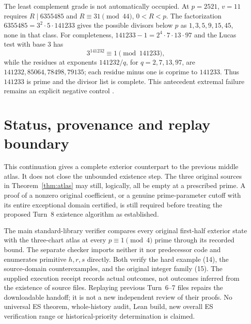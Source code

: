 The least complement grade is not automatically occupied. At $p=2521$, $v=11$
requires $R\mid6355485$ and $R\equiv31\pmod{44}$, $0<R<p$.
The factorization $6355485=3^2\cdot5\cdot141233$ gives the possible divisors
below $p$ as $1,3,5,9,15,45$, none in that class.  For completeness,
$141233-1=2^4\cdot7\cdot13\cdot97$ and the Lucas test with base $3$ has
\[
 3^{141232}\equiv1\pmod{141233},
\]
while the residues at exponents $141232/q$, for $q=2,7,13,97$, are
$141232,85064,78498,79135$; each residue minus one is coprime to $141233$.
Thus $141233$ is prime and the divisor list is complete.  This antecedent
extremal failure remains an explicit negative control \cite{Localization}.

\section{Status, provenance and replay boundary}
This continuation gives a complete exterior counterpart to the previous middle
atlas. It does not close the unbounded existence step. The three original
sources in Theorem~\ref{thm:atlas} may still, logically, all be empty at a
prescribed prime. A proof of a nonzero original coefficient, or a genuine
prime-parameter cutoff with its entire exceptional domain certified, is still
required before treating the proposed Turn~8 existence algorithm as established.

The main standard-library verifier compares every original first-half exterior
state with the three-chart atlas at every $p\equiv1\pmod4$ prime through its
recorded bound. The separate checker imports neither it nor predecessor code
and enumerates primitive $h,r,s$ directly. Both verify the hard example (14),
the source-domain counterexamples, and the original integer family (15).
The supplied execution receipt records actual outcomes, not outcomes inferred
from the existence of source files. Replaying previous Turn~6--7 files repairs
the downloadable handoff; it is not a new independent review of their proofs.
No universal ES theorem, whole-history audit, Lean build, new overall ES
verification range or historical-priority determination is claimed.
